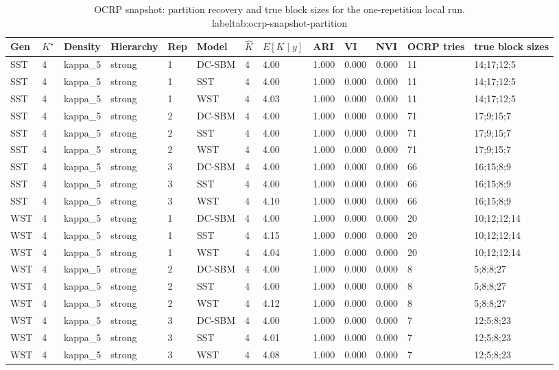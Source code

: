 \begin{table}[!h]
\centering
\caption{OCRP snapshot: partition recovery and true block sizes for the one-repetition local run.\\label{tab:ocrp-snapshot-partition}}
\centering
\begin{tabular}[t]{lllllllllllll}
\toprule
Gen & $K^\star$ & Density & Hierarchy & Rep & Model & $\hat K$ & $E[K\mid y]$ & ARI & VI & NVI & OCRP tries & true block sizes\\
\midrule
SST & 4 & kappa_5 & strong & 1 & DC-SBM & 4 & 4.00 & 1.000 & 0.000 & 0.000 & 11 & 14;17;12;5\\
SST & 4 & kappa_5 & strong & 1 & SST & 4 & 4.00 & 1.000 & 0.000 & 0.000 & 11 & 14;17;12;5\\
SST & 4 & kappa_5 & strong & 1 & WST & 4 & 4.03 & 1.000 & 0.000 & 0.000 & 11 & 14;17;12;5\\
SST & 4 & kappa_5 & strong & 2 & DC-SBM & 4 & 4.00 & 1.000 & 0.000 & 0.000 & 71 & 17;9;15;7\\
SST & 4 & kappa_5 & strong & 2 & SST & 4 & 4.00 & 1.000 & 0.000 & 0.000 & 71 & 17;9;15;7\\
SST & 4 & kappa_5 & strong & 2 & WST & 4 & 4.00 & 1.000 & 0.000 & 0.000 & 71 & 17;9;15;7\\
SST & 4 & kappa_5 & strong & 3 & DC-SBM & 4 & 4.00 & 1.000 & 0.000 & 0.000 & 66 & 16;15;8;9\\
SST & 4 & kappa_5 & strong & 3 & SST & 4 & 4.00 & 1.000 & 0.000 & 0.000 & 66 & 16;15;8;9\\
SST & 4 & kappa_5 & strong & 3 & WST & 4 & 4.10 & 1.000 & 0.000 & 0.000 & 66 & 16;15;8;9\\
WST & 4 & kappa_5 & strong & 1 & DC-SBM & 4 & 4.00 & 1.000 & 0.000 & 0.000 & 20 & 10;12;12;14\\
WST & 4 & kappa_5 & strong & 1 & SST & 4 & 4.15 & 1.000 & 0.000 & 0.000 & 20 & 10;12;12;14\\
WST & 4 & kappa_5 & strong & 1 & WST & 4 & 4.04 & 1.000 & 0.000 & 0.000 & 20 & 10;12;12;14\\
WST & 4 & kappa_5 & strong & 2 & DC-SBM & 4 & 4.00 & 1.000 & 0.000 & 0.000 & 8 & 5;8;8;27\\
WST & 4 & kappa_5 & strong & 2 & SST & 4 & 4.00 & 1.000 & 0.000 & 0.000 & 8 & 5;8;8;27\\
WST & 4 & kappa_5 & strong & 2 & WST & 4 & 4.12 & 1.000 & 0.000 & 0.000 & 8 & 5;8;8;27\\
WST & 4 & kappa_5 & strong & 3 & DC-SBM & 4 & 4.00 & 1.000 & 0.000 & 0.000 & 7 & 12;5;8;23\\
WST & 4 & kappa_5 & strong & 3 & SST & 4 & 4.01 & 1.000 & 0.000 & 0.000 & 7 & 12;5;8;23\\
WST & 4 & kappa_5 & strong & 3 & WST & 4 & 4.08 & 1.000 & 0.000 & 0.000 & 7 & 12;5;8;23\\
\bottomrule
\end{tabular}
\end{table}
